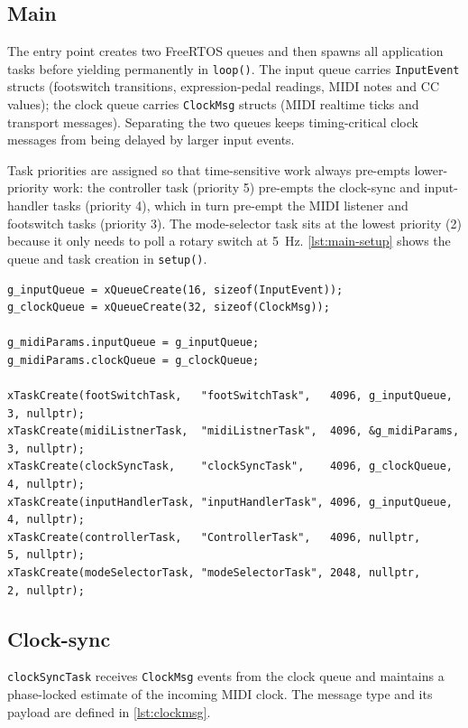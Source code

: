 \subsection{Main}
The entry point creates two FreeRTOS queues and then spawns all application tasks
before yielding permanently in \texttt{loop()}.
The input queue carries \texttt{InputEvent} structs (footswitch transitions, expression-pedal readings, MIDI notes and CC values);
the clock queue carries \texttt{ClockMsg} structs (MIDI realtime ticks and transport messages).
Separating the two queues keeps timing-critical clock messages from being delayed by larger input events.

Task priorities are assigned so that time-sensitive work always pre-empts lower-priority work:
the controller task (priority 5) pre-empts the clock-sync and input-handler tasks (priority 4),
which in turn pre-empt the MIDI listener and footswitch tasks (priority 3).
The mode-selector task sits at the lowest priority (2) because it only needs to poll a rotary switch at 5~Hz.
\autoref{lst:main-setup} shows the queue and task creation in \texttt{setup()}.

\begin{listing}[H]
	\begin{verbatim}
g_inputQueue = xQueueCreate(16, sizeof(InputEvent));
g_clockQueue = xQueueCreate(32, sizeof(ClockMsg));

g_midiParams.inputQueue = g_inputQueue;
g_midiParams.clockQueue = g_clockQueue;

xTaskCreate(footSwitchTask,   "footSwitchTask",   4096, g_inputQueue,   3, nullptr);
xTaskCreate(midiListnerTask,  "midiListnerTask",  4096, &g_midiParams,  3, nullptr);
xTaskCreate(clockSyncTask,    "clockSyncTask",    4096, g_clockQueue,   4, nullptr);
xTaskCreate(inputHandlerTask, "inputHandlerTask", 4096, g_inputQueue,   4, nullptr);
xTaskCreate(controllerTask,   "ControllerTask",   4096, nullptr,        5, nullptr);
xTaskCreate(modeSelectorTask, "modeSelectorTask", 2048, nullptr,        2, nullptr);
\end{verbatim}
	\caption{Queue creation and task spawning in \texttt{setup()}.}
	\label{lst:main-setup}
\end{listing}

\subsection{Clock-sync}
\texttt{clockSyncTask} receives \texttt{ClockMsg} events from the clock queue and maintains
a phase-locked estimate of the incoming MIDI clock.
The message type and its payload are defined in \autoref{lst:clockmsg}.


